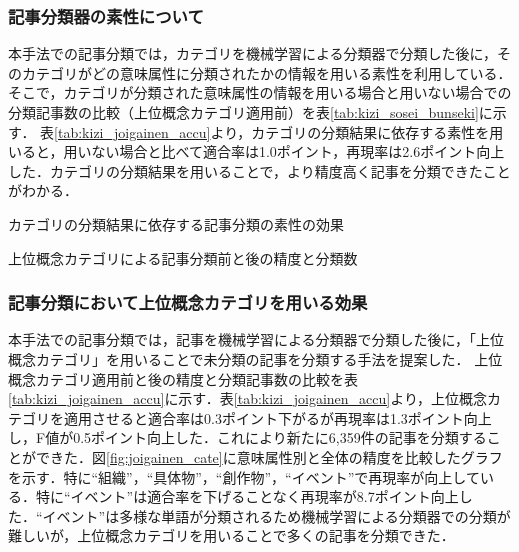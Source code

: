 \documentclass[japanese]{jnlp_1.4}
\begin{document}
\subsubsection{記事分類器の素性について}

本手法での記事分類では，カテゴリを機械学習による分類器で分類した後に，そのカテゴリがどの意味属性に分類されたかの情報を用いる素性を利用している．
そこで，カテゴリが分類された意味属性の情報を用いる場合と用いない場合での
分類記事数の比較（上位概念カテゴリ適用前）を表\ref{tab:kizi_sosei_bunseki}に示す．
表\ref{tab:kizi_joigainen_accu}より，カテゴリの分類結果に依存する素性を用いると，用いない場合と比べて適合率は1.0ポイント，再現率は2.6ポイント向上した．カテゴリの分類結果を用いることで，より精度高く記事を分類できたことがわかる．

\begin{table}[t]
\caption{カテゴリの分類結果に依存する記事分類の素性の効果}
\label{tab:kizi_sosei_bunseki}

\end{table}
\begin{table}[t]
\caption{上位概念カテゴリによる記事分類前と後の精度と分類数}
\label{tab:kizi_joigainen_accu}

\end{table}



\subsubsection{記事分類において上位概念カテゴリを用いる効果}

本手法での記事分類では，記事を機械学習による分類器で分類した後に，「上位概念カテゴリ」を用いることで未分類の記事を分類する手法を提案した．
上位概念カテゴリ適用前と後の精度と分類記事数の比較を表\ref{tab:kizi_joigainen_accu}に示す．表\ref{tab:kizi_joigainen_accu}より，上位概念カテゴリを適用させると適合率は0.3ポイント下がるが再現率は1.3ポイント向上し，F値が0.5ポイント向上した．これにより新たに6,359件の記事を分類することができた．図\ref{fig:joigainen_cate}に意味属性別と全体の精度を比較したグラフを示す．特に``組織''，``具体物''，``創作物''，``イベント''で再現率が向上している．特に``イベント''は適合率を下げることなく再現率が8.7ポイント向上した．``イベント''は多様な単語が分類されるため機械学習による分類器での分類が難しいが，上位概念カテゴリを用いることで多くの記事を分類できた．
\end{document}
